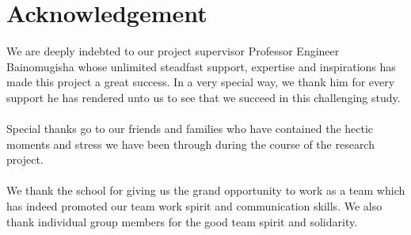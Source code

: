 \chapter*{Acknowledgement}
We are deeply indebted to our project supervisor Professor Engineer Bainomugisha whose unlimited steadfast support, expertise and inspirations has made this project a great success. In a very special way, we thank him for every support he has rendered unto us to see that we succeed in this challenging study.\\\\
Special thanks go to our friends and families who have contained the hectic moments and stress we have been through during the course of the research project.\\\\
We thank the school for giving us the grand opportunity to work as a team which has indeed promoted our team work spirit and communication skills. We also thank individual group members for the good team spirit and solidarity.

\newpage